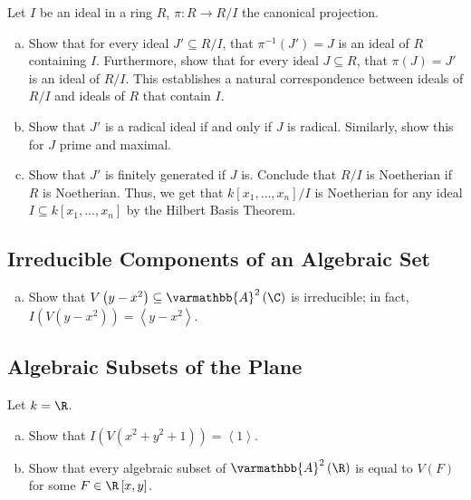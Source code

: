 \documentclass[10pt]{mypackage}
\renewcommand*{\mathbb}[1]{\varmathbb{#1}}
\newcommand{\A}{\mathbb{A}}
\begin{document}
\begin{exercise}[Exercise 1.22]
Let $I$ be an ideal in a ring $R$, $\pi\colon R\rightarrow R/I$ the canonical projection.
\begin{enumerate}[(a)]
  \item Show that for every ideal $J'\subseteq R/I$, that $\pi^{-1}\left( J' \right) = J$ is an ideal of $R$ containing $I$. Furthermore, show that for every ideal $J\subseteq R$, that $\pi\left( J \right) = J'$ is an ideal of $R/I$. This establishes a natural correspondence between ideals of $R/I$ and ideals of $R$ that contain $I$.
  \item Show that $J'$ is a radical ideal if and only if $J$ is radical. Similarly, show this for $J$ prime and maximal.
  \item Show that $J'$ is finitely generated if $J$ is. Conclude that $R/I$ is Noetherian if $R$ is Noetherian. Thus, we get that $k\left[ x_1,\dots,x_n \right]/I$ is Noetherian for any ideal $I\subseteq k\left[ x_1,\dots,x_n \right]$ by the Hilbert Basis Theorem.
\end{enumerate}
\end{exercise}

\subsection{Irreducible Components of an Algebraic Set}%
\begin{exercise}[Exercise 1.25]\hfill
  \begin{enumerate}[(a)]
    \item Show that $V\left(y-x^2\right)\subseteq \A^2\left(\C\right)$ is irreducible; in fact, $I\left(V\left(y-x^2\right)\right) = \left\langle y-x^2 \right\rangle$.
  \end{enumerate}
\end{exercise}
\subsection{Algebraic Subsets of the Plane}%
\begin{exercise}[Exercise 1.30]
Let $k = \R$. 
\begin{enumerate}[(a)]
  \item Show that $I\left(V\left(x^2 + y^2 + 1\right)\right) = \left\langle 1 \right\rangle$.
  \item Show that every algebraic subset of $\A^2\left(\R\right)$ is equal to $V(F)$ for some $F\in \R\left[x,y\right]$.
\end{enumerate}
\end{exercise}
\end{document}
